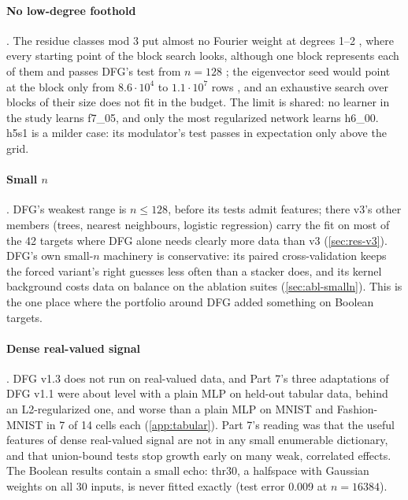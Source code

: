 \paragraph{No low-degree foothold} . The residue classes mod 3 put almost no Fourier weight at degrees 1--2 , where every starting point of the block search looks, although one block represents each of them and passes DFG's test from $n=128$ ; the eigenvector seed would point at the block only from $8.6\cdot10^4$ to $1.1\cdot10^7$ rows , and an exhaustive search over blocks of their size does not fit in the budget. The limit is shared: no learner in the study learns f7\_05, and only the most regularized network learns h6\_00. h5s1 is a milder case: its modulator's test passes in expectation only above the grid.

\paragraph{Small $n$} . DFG's weakest range is $n\le128$, before its tests admit features; there v3's other members (trees, nearest neighbours, logistic regression) carry the fit on most of the 42 targets where DFG alone needs clearly more data than v3 (\cref{sec:res-v3}). DFG's own small-$n$ machinery is conservative: its paired cross-validation keeps the forced variant's right guesses less often than a stacker does, and its kernel background costs data on balance on the ablation suites (\cref{sec:abl-smalln}). This is the one place where the portfolio around DFG added something on Boolean targets.

\paragraph{Dense real-valued signal} . DFG v1.3 does not run on real-valued data, and Part 7's three adaptations of DFG v1.1 were about level with a plain MLP on held-out tabular data, behind an L2-regularized one, and worse than a plain MLP on MNIST and Fashion-MNIST in 7 of 14 cells each \cite{discretelearners2026} (\cref{app:tabular}). Part 7's reading was that the useful features of dense real-valued signal are not in any small enumerable dictionary, and that union-bound tests stop growth early on many weak, correlated effects. The Boolean results contain a small echo: thr30, a halfspace with Gaussian weights on all 30 inputs, is never fitted exactly (test error 0.009 at $n=16384$).

